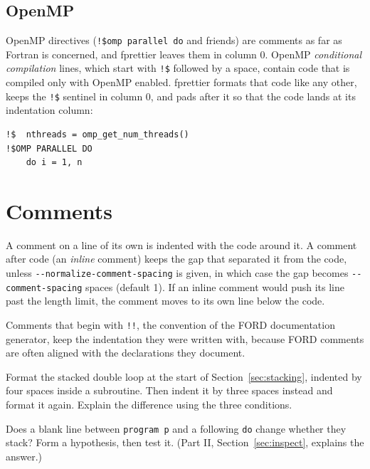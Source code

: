 \documentclass[11pt,a4paper,openany]{book}
\newcommand{\code}[1]{\texttt{\small #1}}
\newcommand{\flag}[1]{\texttt{\small -{}-#1}}
\newcounter{exercise}[chapter]
\begin{document}
\subsection{OpenMP}

OpenMP directives (\code{!\$omp parallel do} and friends) are comments as far as
Fortran is concerned, and fprettier leaves them in column 0. OpenMP
\emph{conditional compilation} lines, which start with \code{!\$} followed by a space,
contain code that is compiled only with OpenMP enabled. fprettier formats that
code like any other, keeps the \code{!\$} sentinel in column 0, and pads after it
so that the code lands at its indentation column:

\begin{lstlisting}[style=after]
!$  nthreads = omp_get_num_threads()
!$OMP PARALLEL DO
    do i = 1, n
\end{lstlisting}

\section{Comments}

A comment on a line of its own is indented with the code around it. A comment
after code (an \emph{inline} comment) keeps the gap that separated it from the
code, unless \flag{normalize-comment-spacing} is given, in which case the gap
becomes \flag{comment-spacing} spaces (default 1). If an inline comment would
push its line past the length limit, the comment moves to its own line below the
code.

Comments that begin with \code{!!}, the convention of the FORD documentation
generator, keep the indentation they were written with, because FORD comments
are often aligned with the declarations they document.

\begin{exercise}[Stacking]
Format the stacked double loop at the start of Section~\ref{sec:stacking},
indented by four spaces inside a subroutine. Then indent it by three spaces
instead and format it again. Explain the difference using the three
conditions.
\end{exercise}

\begin{exercise}
Does a blank line between \code{program p} and a following \code{do} change
whether they stack? Form a hypothesis, then test it. (Part II,
Section~\ref{sec:inspect}, explains the answer.)
\end{exercise}
\end{document}
